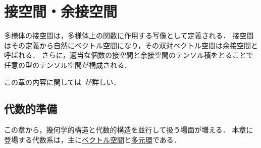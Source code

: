 \documentclass[geometry_main]{subfiles}
\begin{document}
\setcounter{chapter}{2}


\chapter{接空間・余接空間}

多様体の接空間は，多様体上の\cinfty 関数に作用する写像として定義される．
接空間はその定義から自然にベクトル空間になり，その双対ベクトル空間は余接空間と呼ばれる．
さらに，適当な個数の接空間と余接空間のテンソル積をとることで任意の型のテンソル空間が構成される．

この章の内容に関しては~\cite[Chapter3, 8, 11, 12]{Lee12}が詳しい．

\section{代数的準備}

この章から，幾何学的構造と代数的構造を並行して扱う場面が増える．
本章に登場する代数系は，主に\hyperref[ax.vector]{ベクトル空間}と\hyperref[ax.alg]{多元環}である．
\end{document}
